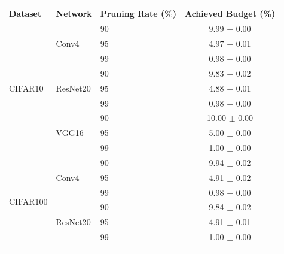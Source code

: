 \begin{table}
  \centering
  \begin{tabular}{lllc}
    \toprule
    \textbf{Dataset}          & \textbf{Network}          & \textbf{Pruning Rate} (\%) &
    \textbf{Achieved Budget} (\%)                                                                         \\
    \midrule
    \multirow{9}{*}{CIFAR10}  & \multirow{3}{*}{Conv4}    & 90                         & 9.99 $\pm$ 0.00  \\
                              &                           & 95                         & 4.97 $\pm$ 0.01  \\
                              &                           & 99                         & 0.98 $\pm$ 0.00  \\
    \cline{2-4}
                              & \multirow{3}{*}{ResNet20} & 90                         & 9.83 $\pm$ 0.02  \\
                              &                           & 95                         & 4.88 $\pm$ 0.01  \\
                              &                           & 99                         & 0.98 $\pm$ 0.00  \\
    \cline{2-4}

                              & \multirow{3}{*}{VGG16}    & 90                         & 10.00 $\pm$ 0.00 \\
                              &                           & 95                         & 5.00 $\pm$ 0.00  \\
                              &                           & 99                         & 1.00 $\pm$ 0.00  \\
    \midrule
    \multirow{9}{*}{CIFAR100} & \multirow{3}{*}{Conv4}    & 90                         & 9.94 $\pm$ 0.02  \\
                              &                           & 95                         & 4.91 $\pm$ 0.02  \\
                              &                           & 99                         & 0.98 $\pm$ 0.00  \\
    \cline{2-4}

                              & \multirow{3}{*}{ResNet20} & 90                         & 9.84 $\pm$ 0.02  \\
                              &                           & 95                         & 4.91 $\pm$ 0.01  \\
                              &                           & 99                         & 1.00 $\pm$ 0.00  \\
    \cline{2-4}


\end{tabular}
\end{table}

